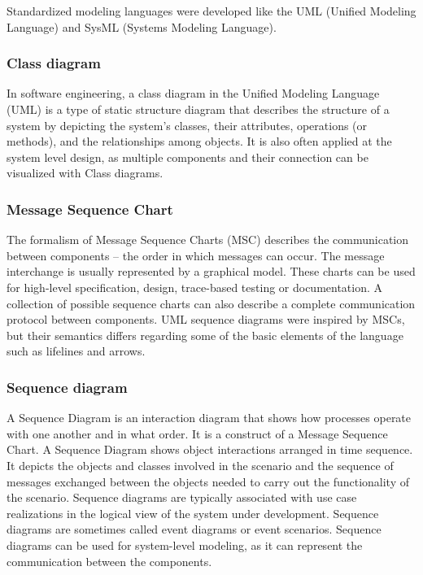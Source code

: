 Standardized modeling languages were developed like the UML (Unified Modeling Language\citep{uml}) and SysML (Systems Modeling Language\citep{sysml1}\citep{sysml2}).

\subsubsection{Class diagram}

In software engineering, a class diagram in the Unified Modeling Language (UML) is a type of static structure diagram that describes the structure of a system by depicting the system's classes, their attributes, operations (or methods), and the relationships among objects. It is also often applied at the system level design, as multiple components and their connection can be visualized with Class diagrams.

\subsubsection{Message Sequence Chart}

The formalism of Message Sequence Charts (MSC) describes the communication between components -- the order in which messages can occur\citep{msc}\citep{msc2}\citep{Klose2003}. The message interchange is usually represented by a graphical model. These charts can be used for high-level specification, design, trace-based testing or documentation. A collection of possible sequence charts can also describe a complete communication protocol between components. UML sequence diagrams were inspired by MSCs, but their semantics differs regarding some of the basic elements of the language such as lifelines and arrows\citep{mscuml}.

\subsubsection{Sequence diagram}

A Sequence Diagram is an interaction diagram that shows how processes operate with one another and in what order. It is a construct of a Message Sequence Chart. A Sequence Diagram shows object interactions arranged in time sequence. It depicts the objects and classes involved in the scenario and the sequence of messages exchanged between the objects needed to carry out the functionality of the scenario. Sequence diagrams are typically associated with use case realizations in the logical view of the system under development. Sequence diagrams are sometimes called event diagrams or event scenarios. Sequence diagrams can be used for system-level modeling, as it can represent the communication between the components. 


